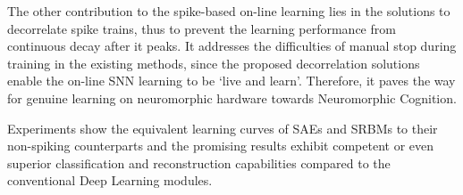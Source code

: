 The other contribution to the spike-based on-line learning lies in the solutions to decorrelate spike trains, thus to prevent the learning performance from continuous decay after it peaks.
It addresses the difficulties of manual stop during training in the existing methods, since the proposed decorrelation solutions enable the on-line SNN learning to be `live and learn'.
Therefore, it paves the way for genuine learning on neuromorphic hardware towards Neuromorphic Cognition.


Experiments show the equivalent learning curves of SAEs and SRBMs to their non-spiking counterparts and the promising results exhibit competent or even superior classification and reconstruction capabilities compared to the conventional Deep Learning modules.
